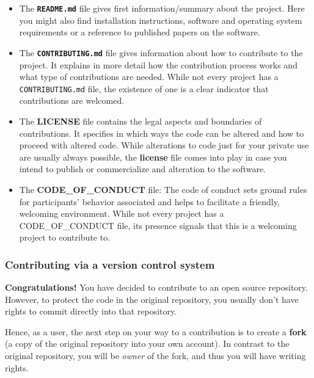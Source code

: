 \documentclass[
  letterpaper,
  DIV=11,
  numbers=noendperiod]{scrreport}
\providecommand{\tightlist}{%
  \setlength{\itemsep}{0pt}\setlength{\parskip}{0pt}}\usepackage{longtable,booktabs,array}
\begin{document}
\begin{itemize}
\tightlist
\item
  The \textbf{\texttt{README.md}} file gives first information/summary
  about the project. Here you might also find installation instructions,
  software and operating system requirements or a reference to published
  papers on the software.
\item
  The \textbf{\texttt{CONTRIBUTING.md}} file gives information about how
  to contribute to the project. It explains in more detail how the
  contribution process works and what type of contributions are needed.
  While not every project has a \texttt{CONTRIBUTING.md} file, the
  existence of one is a clear indicator that contributions are
  welcomed.\\
\item
  The \textbf{LICENSE} file contains the legal aspects and boundaries of
  contributions. It specifies in which ways the code can be altered and
  how to proceed with altered code. While alterations to code just for
  your private use are usually always possible, the \textbf{license}
  file comes into play in case you intend to publish or commercialize
  and alteration to the software.
\item
  The \textbf{CODE\_OF\_CONDUCT} file: The code of conduct sets ground
  rules for participants' behavior associated and helps to facilitate a
  friendly, welcoming environment. While not every project has a
  CODE\_OF\_CONDUCT file, its presence signals that this is a welcoming
  project to contribute to.
\end{itemize}

\hypertarget{contributing-via-a-version-control-system}{%
\subsubsection{Contributing via a version control
system}\label{contributing-via-a-version-control-system}}

\textbf{Congratulations!} You have decided to contribute to an open
source repository. However, to protect the code in the original
repository, you usually don't have rights to commit directly into that
repository.

Hence, as a user, the next step on your way to a contribution is to
create a \textbf{fork} (a copy of the original repository into your own
account). In contrast to the original repository, you will be
\emph{owner} of the fork, and thus you will have writing rights.
\end{document}
